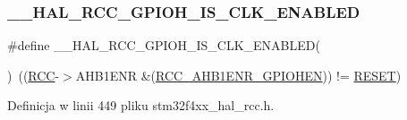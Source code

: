 \subsubsection{\texorpdfstring{\+\_\+\+\_\+\+H\+A\+L\+\_\+\+R\+C\+C\+\_\+\+G\+P\+I\+O\+H\+\_\+\+I\+S\+\_\+\+C\+L\+K\+\_\+\+E\+N\+A\+B\+L\+ED}{\_\_HAL\_RCC\_GPIOH\_IS\_CLK\_ENABLED}}
{\footnotesize\ttfamily \#define \+\_\+\+\_\+\+H\+A\+L\+\_\+\+R\+C\+C\+\_\+\+G\+P\+I\+O\+H\+\_\+\+I\+S\+\_\+\+C\+L\+K\+\_\+\+E\+N\+A\+B\+L\+ED(\begin{DoxyParamCaption}{ }\end{DoxyParamCaption})~((\hyperlink{group___peripheral__declaration_ga74944438a086975793d26ae48d5882d4}{R\+CC}-\/$>$A\+H\+B1\+E\+NR \&(\hyperlink{group___peripheral___registers___bits___definition_gadb16afc550121895822ebb22108196b6}{R\+C\+C\+\_\+\+A\+H\+B1\+E\+N\+R\+\_\+\+G\+P\+I\+O\+H\+EN})) != \hyperlink{group___exported__types_gga89136caac2e14c55151f527ac02daaffa589b7d94a3d91d145720e2fed0eb3a05}{R\+E\+S\+ET})}



Definicja w linii 449 pliku stm32f4xx\+\_\+hal\+\_\+rcc.\+h.


